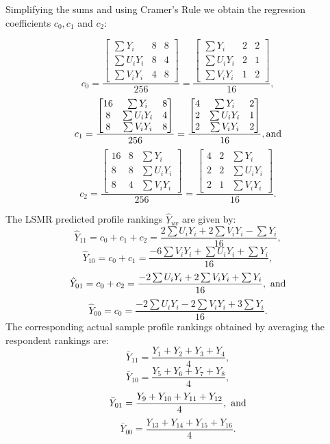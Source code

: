 \documentclass[a4paper, 12pt]{article}
\begin{document}
{\flushleft Simplifying} the sums and using Cramer's Rule  we obtain the regression coefficients $c_0,c_1$ and $c_2$:

$$
c_0 =
\frac{
	\begin{bmatrix}
	\sum Y_i & 8 & 8\\
	\sum U_iY_i& 8 & 4\\
	\sum V_iY_i & 4 & 8
	\end{bmatrix}
}{256} = \frac{
	\begin{bmatrix}
	\sum Y_i & 2 & 2\\
	\sum U_iY_i& 2 & 1\\
	\sum V_iY_i & 1 & 2
	\end{bmatrix}
}{16},
$$
$$
c_1 =
\frac{
	\begin{bmatrix}
	16 & \sum Y_i & 8 \\
	8 & \sum U_iY_i& 4\\
	8 & \sum V_iY_i & 8
	\end{bmatrix}
}{256} = \frac{
	\begin{bmatrix}
	4 & \sum Y_i & 2 \\
	2 & \sum U_iY_i& 1\\
	2 & \sum V_iY_i & 2
	\end{bmatrix}
}{16}, \textup{and}
$$
$$
c_2 =
\frac{
	\begin{bmatrix}
	16 &  8 & \sum Y_i\\
	8 & 8 & \sum U_iY_i \\
	8 & 4 & \sum V_iY_i
	\end{bmatrix}
}{256} = \frac{
	\begin{bmatrix}
	4 & 2 & \sum Y_i\\
	2 & 2 & \sum U_iY_i \\
	2 & 1 & \sum V_iY_i
	\end{bmatrix}
}{16}.
$$

The LSMR predicted profile rankings $ \hat{Y}_{uv}$  are given by:
$$\hat{Y}_{11} = c_0 + c_1 + c_2 =
\frac{2\sum U_iY_i + 2\sum V_iY_i - \sum Y_i}{16},$$
$$\hat{Y}_{10} = c_0 + c_1 =
\frac{-6 \sum V_iY_i + \sum U_iY_i + \sum Y_i}{16},$$
$$\hat{Y}_{01} = c_0 + c_2 =
\frac{-2\sum U_iY_i + 2\sum V_iY_i + \sum Y_i}{16}, \textup{  and}$$
$$\hat{Y}_{00} = c_0 =
\frac{-2\sum U_iY_i - 2\sum V_iY_i +3 \sum Y_i}{16}.$$
The corresponding actual sample profile rankings obtained by averaging the respondent rankings are:
$$\bar{Y}_{11} = \frac{Y_1+Y_2+Y_3+Y_4}{4},$$
$$\bar{Y}_{10} = \frac{Y_5+Y_6+Y_7+Y_8}{4},$$
$$\bar{Y}_{01} = \frac{Y_9+Y_{10}+Y_{11}+Y_{12}}{4}, \textup{  and}$$
$$\bar{Y}_{00} = \frac{Y_{13}+Y_{14}+Y_{15}+Y_{16}}{4}.$$
\end{document}
